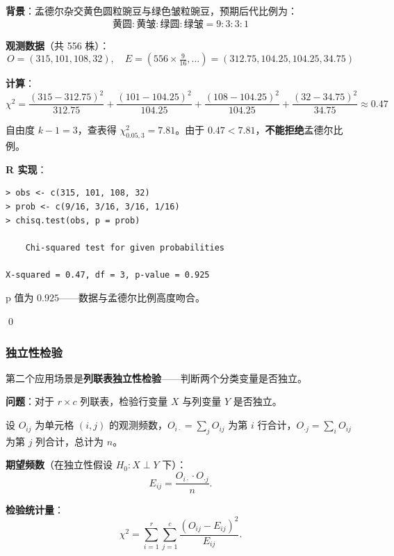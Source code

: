 \begin{Example}\label{ex:mendel-pea}
\textbf{背景}：孟德尔杂交黄色圆粒豌豆与绿色皱粒豌豆，预期后代比例为：
\[
\text{黄圆} : \text{黄皱} : \text{绿圆} : \text{绿皱} = 9 : 3 : 3 : 1
\]

\textbf{观测数据}（共 556 株）：
\[
O = (315, 101, 108, 32), \quad E = (556 \times \tfrac{9}{16}, \ldots) = (312.75, 104.25, 104.25, 34.75)
\]

\textbf{计算}：
\[
\chi^2 = \frac{(315-312.75)^2}{312.75} + \frac{(101-104.25)^2}{104.25} + \frac{(108-104.25)^2}{104.25} + \frac{(32-34.75)^2}{34.75} \approx 0.47
\]

自由度 $k-1 = 3$，查表得 $\chi^2_{0.05, 3} = 7.81$。由于 $0.47 < 7.81$，\textbf{不能拒绝}孟德尔比例。

\textbf{R 实现}：
\begin{verbatim}
> obs <- c(315, 101, 108, 32)
> prob <- c(9/16, 3/16, 3/16, 1/16)
> chisq.test(obs, p = prob)

    Chi-squared test for given probabilities

X-squared = 0.47, df = 3, p-value = 0.925
\end{verbatim}

p 值为 $0.925$——数据与孟德尔比例高度吻合。

\qed
\end{Example}

\subsubsection{独立性检验}

第二个应用场景是\textbf{列联表独立性检验}——判断两个分类变量是否独立。

\textbf{问题}：对于 $r \times c$ 列联表，检验行变量 $X$ 与列变量 $Y$ 是否独立。

设 $O_{ij}$ 为单元格 $(i,j)$ 的观测频数，$O_{i\cdot} = \sum_j O_{ij}$ 为第 $i$ 行合计，$O_{\cdot j} = \sum_i O_{ij}$ 为第 $j$ 列合计，总计为 $n$。

\textbf{期望频数}（在独立性假设 $H_0: X \perp Y$ 下）：
\begin{equation}
E_{ij} = \frac{O_{i\cdot} \cdot O_{\cdot j}}{n}.
\label{eq:expected-frequency-2d}
\end{equation}

\textbf{检验统计量}：
\begin{equation}
\chi^2 = \sum_{i=1}^{r} \sum_{j=1}^{c} \frac{(O_{ij} - E_{ij})^2}{E_{ij}}.
\label{eq:chi-square-independence}
\end{equation}

